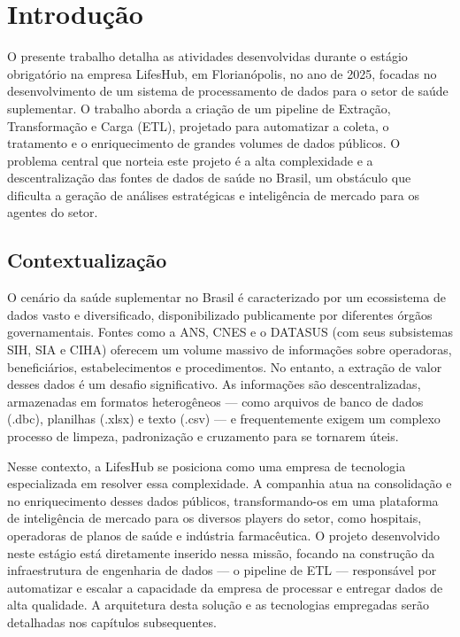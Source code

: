 \chapter{Introdução}

O presente trabalho detalha as atividades desenvolvidas durante o estágio obrigatório na empresa LifesHub, em Florianópolis, no ano de 2025, focadas no desenvolvimento de um sistema de processamento de dados para o setor de saúde suplementar. O trabalho aborda a criação de um pipeline de Extração, Transformação e Carga (ETL), projetado para automatizar a coleta, o tratamento e o enriquecimento de grandes volumes de dados públicos. O problema central que norteia este projeto é a alta complexidade e a descentralização das fontes de dados de saúde no Brasil, um obstáculo que dificulta a geração de análises estratégicas e inteligência de mercado para os agentes do setor.

\section{Contextualização}

O cenário da saúde suplementar no Brasil é caracterizado por um ecossistema de dados vasto e diversificado, disponibilizado publicamente por diferentes órgãos governamentais. Fontes como a ANS, CNES e o DATASUS (com seus subsistemas SIH, SIA e CIHA) oferecem um volume massivo de informações sobre operadoras, beneficiários, estabelecimentos e procedimentos. No entanto, a extração de valor desses dados é um desafio significativo. As informações são descentralizadas, armazenadas em formatos heterogêneos — como arquivos de banco de dados (.dbc), planilhas (.xlsx) e texto (.csv) — e frequentemente exigem um complexo processo de limpeza, padronização e cruzamento para se tornarem úteis.

Nesse contexto, a LifesHub se posiciona como uma empresa de tecnologia especializada em resolver essa complexidade. A companhia atua na consolidação e no enriquecimento desses dados públicos, transformando-os em uma plataforma de inteligência de mercado para os diversos players do setor, como hospitais, operadoras de planos de saúde e indústria farmacêutica. O projeto desenvolvido neste estágio está diretamente inserido nessa missão, focando na construção da infraestrutura de engenharia de dados — o pipeline de ETL — responsável por automatizar e escalar a capacidade da empresa de processar e entregar dados de alta qualidade.
A arquitetura desta solução e as tecnologias empregadas serão detalhadas nos capítulos subsequentes.

